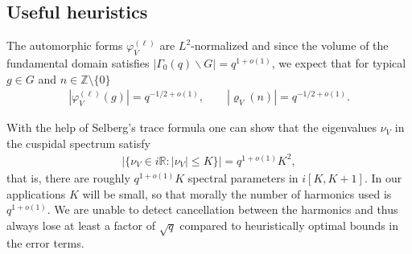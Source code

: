 \documentclass[12pt]{amsart}
\theoremstyle{definition}
\theoremstyle{remark}
\numberwithin{equation}{section}
\newcommand{\R}{{\mathbb R}}
\newcommand{\Z}{{\mathbb Z}}
\newcommand{\1}{{\mathbf 1}}
\begin{document}
\subsection{Useful heuristics}
The automorphic forms $\varphi_V^{(\ell)}$ are $L^2$-normalized and since the volume of the fundamental domain satisfies $|\Gamma_0(q) \backslash G|  = q^{1+o(1)}$, we expect that for typical  $g \in G$ and $n \in \Z\setminus\{0\}$
\begin{align*}
  |\varphi_V^{(\ell)}(g)| = q^{-1/2+o(1)}, \quad \quad |\varrho_V(n) |   = q^{-1/2+o(1)}.
\end{align*}

With the help of Selberg's trace formula one can show that the eigenvalues $\nu_V$ in the cuspidal spectrum satisfy
\begin{align*}
    |\{ \nu_V \in i\R: |\nu_V| \leq K \}| = q^{1+o(1)} K^2,
\end{align*}
that is, there are roughly $q^{1+o(1)} K$ spectral parameters in $i[K,K+1]$. In our applications $K$ will be small, so that morally the number of harmonics used is  $q^{1+o(1)}$. We are unable to detect cancellation between the harmonics and thus always lose  at least a factor of $\sqrt{q}$ compared to heuristically optimal bounds in the error terms.
\end{document}
